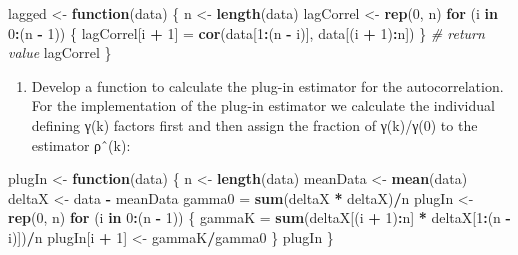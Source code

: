 \documentclass[
]{article}
\newenvironment{Shaded}{\begin{snugshade}}{\end{snugshade}}
\newcommand{\CommentTok}[1]{\textcolor[rgb]{0.56,0.35,0.01}{\textit{#1}}}
\newcommand{\ControlFlowTok}[1]{\textcolor[rgb]{0.13,0.29,0.53}{\textbf{#1}}}
\newcommand{\DecValTok}[1]{\textcolor[rgb]{0.00,0.00,0.81}{#1}}
\newcommand{\KeywordTok}[1]{\textcolor[rgb]{0.13,0.29,0.53}{\textbf{#1}}}
\newcommand{\NormalTok}[1]{#1}
\newcommand{\OperatorTok}[1]{\textcolor[rgb]{0.81,0.36,0.00}{\textbf{#1}}}
\newcommand{\StringTok}[1]{\textcolor[rgb]{0.31,0.60,0.02}{#1}}
\providecommand{\tightlist}{%
  \setlength{\itemsep}{0pt}\setlength{\parskip}{0pt}}
\begin{document}
\begin{Shaded}
\begin{Highlighting}[]
\NormalTok{lagged <-}\StringTok{ }\ControlFlowTok{function}\NormalTok{(data) \{}
\NormalTok{n <-}\StringTok{ }\KeywordTok{length}\NormalTok{(data)}
\NormalTok{lagCorrel <-}\StringTok{ }\KeywordTok{rep}\NormalTok{(}\DecValTok{0}\NormalTok{, n)}
\ControlFlowTok{for}\NormalTok{ (i }\ControlFlowTok{in} \DecValTok{0}\OperatorTok{:}\NormalTok{(n }\OperatorTok{-}\StringTok{ }\DecValTok{1}\NormalTok{)) \{}
\NormalTok{lagCorrel[i }\OperatorTok{+}\StringTok{ }\DecValTok{1}\NormalTok{] =}\StringTok{ }\KeywordTok{cor}\NormalTok{(data[}\DecValTok{1}\OperatorTok{:}\NormalTok{(n }\OperatorTok{-}\StringTok{ }\NormalTok{i)], data[(i }\OperatorTok{+}
\DecValTok{1}\NormalTok{)}\OperatorTok{:}\NormalTok{n])}
\NormalTok{\}}
\CommentTok{# return value}
\NormalTok{lagCorrel}
\NormalTok{\}}
\end{Highlighting}
\end{Shaded}

\begin{enumerate}
\def\labelenumi{\alph{enumi})}
\setcounter{enumi}{1}
\tightlist
\item
  Develop a function to calculate the plug-in estimator for the
  autocorrelation. For the implementation of the plug-in estimator we
  calculate the individual defining γ(k) factors first and then assign
  the fraction of γ(k)/γ(0) to the estimator ρˆ(k):
\end{enumerate}

\begin{Shaded}
\begin{Highlighting}[]
\NormalTok{plugIn <-}\StringTok{ }\ControlFlowTok{function}\NormalTok{(data) \{}
\NormalTok{n <-}\StringTok{ }\KeywordTok{length}\NormalTok{(data)}
\NormalTok{meanData <-}\StringTok{ }\KeywordTok{mean}\NormalTok{(data)}
\NormalTok{deltaX <-}\StringTok{ }\NormalTok{data }\OperatorTok{-}\StringTok{ }\NormalTok{meanData}
\NormalTok{gamma0 =}\StringTok{ }\KeywordTok{sum}\NormalTok{(deltaX }\OperatorTok{*}\StringTok{ }\NormalTok{deltaX)}\OperatorTok{/}\NormalTok{n}
\NormalTok{plugIn <-}\StringTok{ }\KeywordTok{rep}\NormalTok{(}\DecValTok{0}\NormalTok{, n)}
\ControlFlowTok{for}\NormalTok{ (i }\ControlFlowTok{in} \DecValTok{0}\OperatorTok{:}\NormalTok{(n }\OperatorTok{-}\StringTok{ }\DecValTok{1}\NormalTok{)) \{}
\NormalTok{gammaK =}\StringTok{ }\KeywordTok{sum}\NormalTok{(deltaX[(i }\OperatorTok{+}\StringTok{ }\DecValTok{1}\NormalTok{)}\OperatorTok{:}\NormalTok{n] }\OperatorTok{*}\StringTok{ }\NormalTok{deltaX[}\DecValTok{1}\OperatorTok{:}\NormalTok{(n }\OperatorTok{-}
\NormalTok{i)])}\OperatorTok{/}\NormalTok{n}
\NormalTok{plugIn[i }\OperatorTok{+}\StringTok{ }\DecValTok{1}\NormalTok{] <-}\StringTok{ }\NormalTok{gammaK}\OperatorTok{/}\NormalTok{gamma0}
\NormalTok{\}}
\NormalTok{plugIn}
\NormalTok{\}}
\end{Highlighting}
\end{Shaded}
\end{document}
